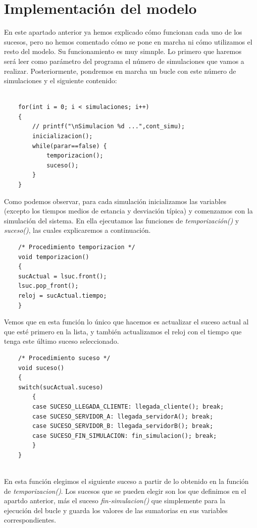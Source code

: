 \documentclass[11pt,a4paper]{article}
\begin{document}
\section{Implementación del modelo}

En este apartado anterior ya hemos explicado cómo funcionan cada uno de los sucesos, pero no hemos comentado cómo se pone en marcha ni cómo utilizamos
el resto del modelo. Su funcionamiento es muy simnple. Lo primero que haremos será leer como parámetro del programa el número de simulaciones que vamos
a realizar. Posteriormente, pondremos en marcha un bucle con este número de simulaciones y el siguiente contenido:
\begin{lstlisting}

	for(int i = 0; i < simulaciones; i++)
	{
		// printf("\nSimulacion %d ...",cont_simu);
		inicializacion();
		while(parar==false)	{
			temporizacion();
			suceso();
		}
	}

\end{lstlisting}

Como podemos observar, para cada simulación inicializamos las variables (excepto los tiempos medios de estancia y desviación típica) y comenzamos con
la simulación del sistema. En ella ejecutamos las funciones de \textit{temporización()} y \textit{suceso()}, las cuales explicaremos a continuación.

\begin{lstlisting}
	/* Procedimiento temporizacion */
	void temporizacion()
	{
	sucActual = lsuc.front();
	lsuc.pop_front();
	reloj = sucActual.tiempo;
	}

\end{lstlisting}

Vemos que en esta función lo único que hacemos es actualizar el suceso actual al que esté primero en la lista, y también actualizamos el reloj con el
tiempo que tenga este último suceso seleccionado.

\begin{lstlisting}
	/* Procedimiento suceso */
	void suceso()
	{
	switch(sucActual.suceso)
		{
		case SUCESO_LLEGADA_CLIENTE: llegada_cliente(); break;
		case SUCESO_SERVIDOR_A: llegada_servidorA(); break;
		case SUCESO_SERVIDOR_B: llegada_servidorB(); break;
		case SUCESO_FIN_SIMULACION: fin_simulacion(); break;
		}
	}
	
\end{lstlisting}

En esta función elegimos el siguiente suceso a partir de lo obtenido en la función de \textit{temporizacion()}. Los sucesos que se pueden elegir son los
que definimos en el apartdo anterior, más el suceso \textit{fin-simulacion()} que simplemente para la ejecución del bucle y guarda los valores de las
sumatorias en sus variables correspondientes.
\end{document}
